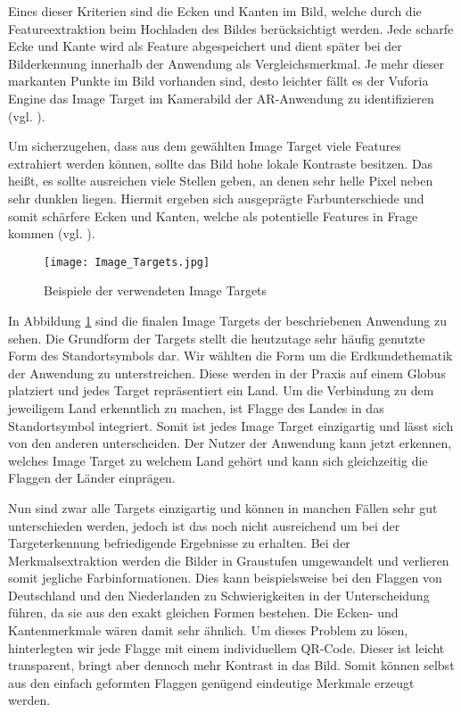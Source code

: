Eines dieser Kriterien sind die Ecken und Kanten im Bild, welche durch die Featureextraktion beim Hochladen des Bildes berücksichtigt werden. 
Jede scharfe Ecke und Kante wird als Feature abgespeichert und dient später bei der Bilderkennung innerhalb der Anwendung als Vergleichsmerkmal. 
Je mehr dieser markanten Punkte im Bild vorhanden sind, desto leichter fällt es der Vuforia Engine das Image Target im Kamerabild der AR-Anwendung zu identifizieren (vgl. \cite{ImageTarget2018}).

Um sicherzugehen, dass aus dem gewählten Image Target viele Features extrahiert werden können, sollte das Bild hohe lokale Kontraste besitzen. Das heißt, es sollte ausreichen viele Stellen geben, an denen sehr helle Pixel neben sehr dunklen liegen. 
Hiermit ergeben sich ausgeprägte Farbunterschiede und somit schärfere Ecken und Kanten, welche als potentielle Features in Frage kommen (vgl. \cite{ImageTarget2018}).

\begin{figure} [h]
\centering
\texttt{[image: Image\_Targets.jpg]}
\caption{Beispiele der verwendeten Image Targets}
\label{fig:image_targets}
\end{figure}

In Abbildung \ref{fig:image_targets} sind die finalen Image Targets der beschriebenen Anwendung zu sehen.
Die Grundform der Targets stellt die heutzutage sehr häufig genutzte Form des Standortsymbols dar.
Wir wählten die Form um die Erdkundethematik der Anwendung zu unterstreichen.
Diese werden in der Praxis auf einem Globus platziert und jedes Target repräsentiert ein Land.
Um die Verbindung zu dem jeweiligem Land erkenntlich zu machen, ist Flagge des Landes in das Standortsymbol integriert. 
Somit ist jedes Image Target einzigartig und lässt sich von den anderen unterscheiden. 
Der Nutzer der Anwendung kann jetzt erkennen, welches Image Target zu welchem Land gehört und kann sich gleichzeitig die Flaggen der Länder einprägen. 

Nun sind zwar alle Targets einzigartig und können in manchen Fällen sehr gut unterschieden werden, jedoch ist das noch nicht ausreichend um bei der Targeterkennung befriedigende Ergebnisse zu erhalten. 
Bei der Merkmalsextraktion werden die Bilder in Graustufen umgewandelt und verlieren somit jegliche Farbinformationen. Dies kann beispielsweise bei den Flaggen von Deutschland und den Niederlanden zu Schwierigkeiten in der Unterscheidung führen, da sie aus den exakt gleichen Formen bestehen. 
Die Ecken- und Kantenmerkmale wären damit sehr ähnlich. 
Um dieses Problem zu lösen, hinterlegten wir jede Flagge mit einem individuellem QR-Code. 
Dieser ist leicht transparent, bringt aber dennoch mehr Kontrast in das Bild. 
Somit können selbst aus den einfach geformten Flaggen genügend eindeutige Merkmale erzeugt werden.

